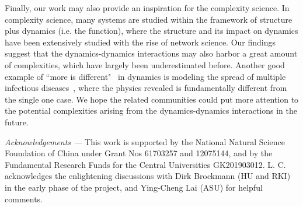 \documentclass[showpacs,superscriptaddress,reprint,nofootinbib,amsmath,amssymb,aps,pre]{revtex4-1}
\begin{document}
Finally, our work may also provide an inspiration for the complexity science. In complexity science, many systems are studied within the framework of structure plus dynamics (i.e. the function), where the structure and its impact on dynamics have been extensively studied with the rise of network science. Our findings suggest that the dynamics-dynamics interactions may also harbor a great amount of complexities, which have largely been underestimated before. Another good example of ``more is different"~\cite{anderson1972more} in dynamics is modeling the spread of multiple infectious diseases~\cite{Cai2015Avalanche,Peter2016Phase,Chen2017Fundamental,Chen2019Persistent}, where the physics revealed is fundamentally different from the single one case. We hope the related communities could put more attention to the potential complexities arising from the dynamics-dynamics interactions in the future.


\textit{Acknowledgements ---}
This work is supported by the National Natural Science Foundation of China under Grant Nos 61703257 and 12075144, and by the Fundamental Research Funds for the Central Universities GK201903012. 
L. C. acknowledges the enlightening discussions with Dirk Brockmann (HU and RKI) in the early phase of the project, and Ying-Cheng Lai (ASU) for helpful comments.
\end{document}
